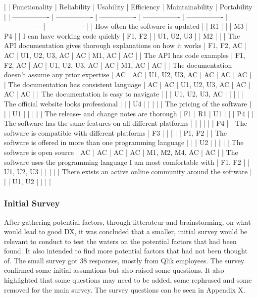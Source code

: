 \documentclass[11pt]{article}
\begin{document}
\begin{multicols}{2}
    |		|	Functionality	|	Reliability	|	Usability 	|	Efficiency	|	Maintainability	|	Portability	|
    |	----------------	|	----------------	|	----------------	|	----------------	|	----------------	|	----------------	|	----------------	|
    |	How often the software is updated	|		|	R1	|		|		|	M3	|	P4	|
    |	I can have working code quickly	|	F1, F2	|		|	U1, U2, U3	|		|	M2	|		|
    |	The API documentation gives thorough explanations on how it works	|	F1, F2, AC	|	AC	|	U1, U2, U3, AC	|	AC	|	M1, AC	|	AC	|
    |	The API has code examples	|	F1, F2, AC	|	AC	|	U1, U2, U3, AC	|	AC	|	M1, AC	|	AC	|
    |	The documentation doesn't assume any prior expertise	|	AC	|	AC	|	U1, U2, U3, AC	|	AC	|	AC	|	AC	|
    |	The documentation has consistent language	|	AC	|	AC	|	U1, U2, U3, AC	|	AC	|	AC	|	AC	|
    |	The documentation is easy to navigate	|		|		|	U1, U2, U3, AC	|		|		|		|
    |	The official website looks professional	|		|		|	U4	|		|		|		|
    |	The pricing of the software	|		|		|	U1	|		|		|		|
    |	The release- and change notes are thorough	|	F1	|	R1	|	U1	|		|		|	P4	|
    |	The software has the same features on all different platforms	|		|		|		|		|		|	P4	|
    |	The software is compatible with different platforms	|	F3	|		|		|		|		|	P1, P2	|
    |	The software is offered in more than one programming language	|		|		|	U2	|		|		|		|
    |	The software is open source	|	AC	|	AC	|	AC	|	AC	|	M1, M2, M4, AC	|	AC	|
    |	The software uses the programming language I am most comfortable with	|	F1, F2	|		|	U1, U2, U3	|		|		|		|
    |	There exists an active online community around the software	|		|		|	U1, U2	|		|		|		|


    \subsubsection{Initial Survey}

    After gathering potential factors, through litterateur and
    brainstorming, on what would lead to good DX, it was concluded that a
    smaller, initial survey would be relevant to conduct to test the waters
    on the potential factors that had been found. It also intended to find
    more potential factors that had not been thought of. The small survey
    got 38 responses, mostly from Qlik employees. The survey confirmed some
    initial assumtions but also raised some questions. It also highlighted
    that some questions may need to be added, some rephrased and some
    removed for the main survey. The survey questions can be seen in
    Appendix X.


\end{multicols}
\end{document}
